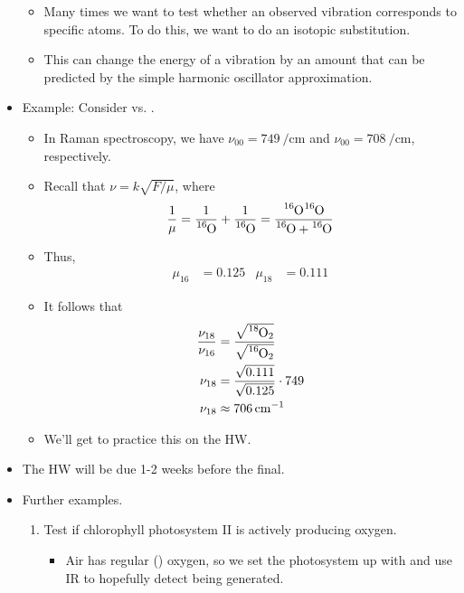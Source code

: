 \documentclass[../notes.tex]{subfiles}
\begin{document}
\begin{itemize}
    \begin{itemize}
        \item Many times we want to test whether an observed vibration corresponds to specific atoms. To do this, we want to do an isotopic substitution.
        \item This can change the energy of a vibration by an amount that can be predicted by the simple harmonic oscillator approximation.
    \end{itemize}
    \item Example: Consider  vs. .
    \begin{itemize}
        \item In Raman spectroscopy, we have $\nu_{00}=\SI{749}{\per\centi\meter}$ and $\nu_{00}=\SI{708}{\per\centi\meter}$, respectively.
        \item Recall that $\nu=k\sqrt{F/\mu}$, where
        \begin{equation*}
            \frac{1}{\mu} = \frac{1}{\ce{{}^16O}}+\frac{1}{\ce{{}^16O}}
            = \frac{\ce{{}^16O}\ce{{}^16O}}{\ce{{}^16O}+\ce{{}^16O}}
        \end{equation*}
        \item Thus,
        \begin{align*}
            \mu_{16} &= 0.125&
            \mu_{18} &= 0.111
        \end{align*}
        \item It follows that
        \begin{align*}
            \frac{\nu_{18}}{\nu_{16}} &= \frac{\sqrt{\ce{{}^18O2}}}{\sqrt{\ce{{}^16O2}}}\\
            \nu_{18} &= \frac{\sqrt{0.111}}{\sqrt{0.125}}\cdot 749\\
            \nu_{18} &\approx \SI{706}{\per\centi\meter}
        \end{align*}
        \item We'll get to practice this on the HW.
    \end{itemize}
    \item The HW will be due 1-2 weeks before the final.
    \item Further examples.
    \begin{enumerate}
        \item Test if chlorophyll photosystem II is actively producing oxygen.
        \begin{itemize}
            \item Air has regular () oxygen, so we set the photosystem up with  and use IR to hopefully detect  being generated.

\end{itemize}
\end{enumerate}
\end{itemize}
\end{document}
